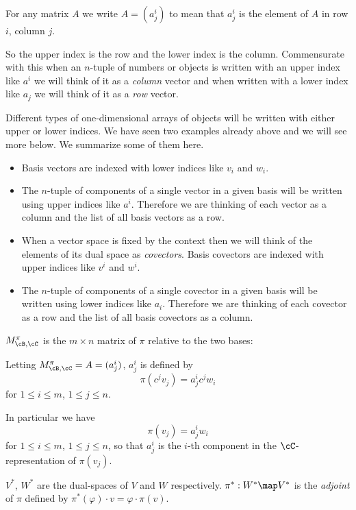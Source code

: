 \documentclass[oneside,12pt]{amsart}
\begin{document}
\begin{definition}
 For any matrix $A$ we write $A=(a^i_j)$ to mean that $a^i_j$ is the
 element of $A$ in row $i$, column $j$. 
\end{definition}

\begin{remark}
 So the upper index is the row and the lower index is the column. Commensurate with this
 when an $n$-tuple of numbers or objects is written with an upper index like $a^i$ we
 will think of it as a \emph{column} vector and when written with a lower index like $a_j$
 we will think of it as a \emph{row} vector.

Different types of one-dimensional arrays of objects will be written with either upper or
lower indices. We have seen two examples already above and we will see more below. We
summarize some of them here.
\begin{itemize}
\item Basis vectors are indexed with lower indices like $v_i$ and $w_i$. 
\item The $n$-tuple of components of a single vector in a given basis will be written using upper indices like $a^i$.
Therefore we are thinking of each vector as a column and the list of all basis vectors as a row.
\item When a vector space is fixed by the context then we will think of the elements of its dual space as \emph{covectors}.
Basis covectors are indexed with upper indices like $v^i$ and $w^i$.
\item The $n$-tuple of components of a single covector in a given basis will be written using lower indices like $a_i$.
Therefore we are thinking of each covector as a row and the list of all basis covectors as a column.
\end{itemize}
\end{remark}


\begin{definition}
$M^{\pi}_{\cB,\cC}$ is the $m\times n$ matrix of $\pi$ 
relative to the two bases:

 Letting $M^{\pi}_{\cB,\cC}=A=(a^i_j)$,
$a^i_j$ is defined by
$$\pi(c^jv_j) = a^i_j c^j w_i$$
for $1\leq i \leq m$, $1\leq j \leq n$.

In particular we have
$$\pi(v_j) = a^i_j  w_i$$
for $1\leq i \leq m$, $1\leq j \leq n$,
so that $a^i_j$ is the $i$-th component in the $\cC$-representation of $\pi(v_j)$.
\end{definition}

\begin{definition}
$V^*$, $W^*$ are the dual-spaces of $V$ and $W$ respectively.
$\pi^*:W^*\map V^*$ is the \emph{adjoint} of $\pi$ defined by
$\pi^*(\varphi) \cdot v = \varphi \cdot \pi(v)$.
\end{definition}
\end{document}
